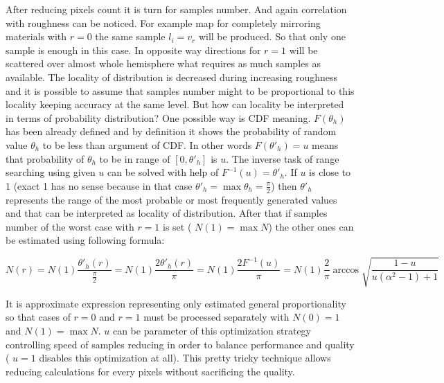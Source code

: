 After reducing pixels count it is turn for samples number. And again correlation with roughness can be noticed. For example map for completely mirroring materials with $r = 0$ the same sample $l_i = v_r$ will be produced. So that only one sample is enough in this case. In opposite way directions for $r = 1$ will be scattered over almost whole hemisphere what requires as much samples as available. The \textquotesingle{}locality\textquotesingle{} of distribution is decreased during increasing roughness and it is possible to assume that samples number might to be proportional to this \textquotesingle{}locality\textquotesingle{} keeping accuracy at the same level. But how can \textquotesingle{}locality\textquotesingle{} be interpreted in terms of probability distribution? One possible way is C\+DF meaning. $F(\theta_h)$ has been already defined and by definition it shows the probability of random value $\theta_h$ to be less than argument of C\+DF. In other words $F(\theta'_h) = u$ means that probability of $\theta_h$ to be in range of $[0, \theta'_h]$ is $u$. The inverse task of range searching using given $u$ can be solved with help of $F^{-1}(u) = \theta'_h$. If $u$ is close to 1 (exact 1 has no sense because in that case $\theta'_h = \max\theta_h = \frac{\pi}{2}$) then $\theta'_h$ represents the range of the most probable or most frequently generated values and that can be interpreted as \textquotesingle{}locality\textquotesingle{} of distribution. After that if samples number of the worst case with $r = 1$ is set ( $N(1) = \max N$) the other ones can be estimated using following formula\+:

\[N(r) = N(1)\frac{\theta'_h(r)}{\frac{\pi}{2}} = N(1)\frac{2\theta'_h(r)}{\pi} = N(1)\frac{2F^{-1}(u)}{\pi} = N(1)\frac{2}{\pi}\arccos\sqrt{\frac{1-u}{u(\alpha^2-1)+1}}\]

It is approximate expression representing only estimated general proportionality so that cases of $r = 0$ and $r = 1$ must be processed separately with $N(0) = 1$ and $N(1) = \max N$. $u$ can be parameter of this optimization strategy controlling speed of samples reducing in order to balance performance and quality ( $u = 1$ disables this optimization at all). This pretty tricky technique allows reducing calculations for every pixels without sacrificing the quality.

